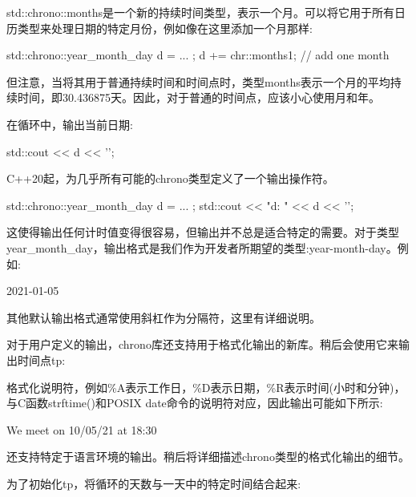 std::chrono::months是一个新的持续时间类型，表示一个月。可以将它用于所有日历类型来处理日期的特定月份，例如像在这里添加一个月那样:

\begin{cpp}
std::chrono::year_month_day d = ... ;
d += chr::months{1}; // add one month
\end{cpp}

但注意，当将其用于普通持续时间和时间点时，类型months表示一个月的平均持续时间，即30.436875天。因此，对于普通的时间点，应该小心使用月和年。


在循环中，输出当前日期:

\begin{cpp}
std::cout << d << '\n';
\end{cpp}

C++20起，为几乎所有可能的chrono类型定义了一个输出操作符。

\begin{cpp}
std::chrono::year_month_day d = ... ;
std::cout << "d: " << d << '\n';
\end{cpp}

这使得输出任何计时值变得很容易，但输出并不总是适合特定的需要。对于类型year\_month\_day，输出格式是我们作为开发者所期望的类型:year-month-day。例如:

\begin{shell}
2021-01-05
\end{shell}

其他默认输出格式通常使用斜杠作为分隔符，这里有详细说明。

对于用户定义的输出，chrono库还支持用于格式化输出的新库。稍后会使用它来输出时间点tp:


格式化说明符，例如\%A表示工作日，\%D表示日期，\%R表示时间(小时和分钟)，与C函数strftime()和POSIX date命令的说明符对应，因此输出可能如下所示:

\begin{shell}
We meet on 10/05/21 at 18:30
\end{shell}

还支持特定于语言环境的输出。稍后将详细描述chrono类型的格式化输出的细节。


为了初始化tp，将循环的天数与一天中的特定时间结合起来:

